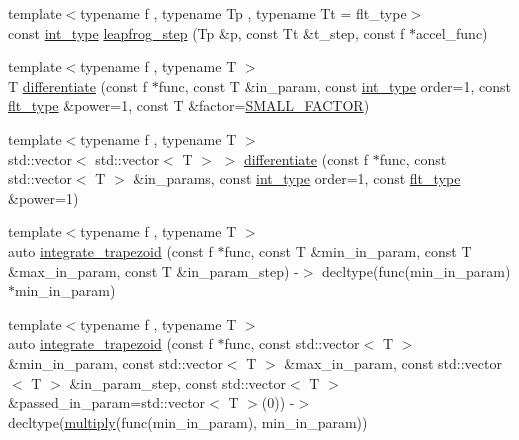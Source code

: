 \begin{DoxyCompactItemize}
\item 
{\footnotesize template$<$typename f , typename Tp , typename Tt  = flt\+\_\+type$>$ }\\const \hyperlink{lib_2IceBRG__main_2common_8h_ac4de9d9335536ac22821171deec8d39e}{int\+\_\+type} \hyperlink{namespaceIceBRG_aa9d2ab9f41c447558b2db6076dfcf3c1}{leapfrog\+\_\+step} (Tp \&p, const Tt \&t\+\_\+step, const f $\ast$accel\+\_\+func)
\item 
{\footnotesize template$<$typename f , typename T $>$ }\\T \hyperlink{namespaceIceBRG_a2e5e6245a68a169006582de78ed4760d}{differentiate} (const f $\ast$func, const T \&in\+\_\+param, const \hyperlink{lib_2IceBRG__main_2common_8h_ac4de9d9335536ac22821171deec8d39e}{int\+\_\+type} order=1, const \hyperlink{lib_2IceBRG__main_2common_8h_ad0f130a56eeb944d9ef2692ee881ecc4}{flt\+\_\+type} \&power=1, const T \&factor=\hyperlink{lib_2IceBRG__main_2common_8h_a730d3bec6e12c0566140efd6b77e3d7d}{S\+M\+A\+L\+L\+\_\+\+F\+A\+C\+T\+O\+R})
\item 
{\footnotesize template$<$typename f , typename T $>$ }\\std\+::vector$<$ std\+::vector$<$ T $>$ $>$ \hyperlink{namespaceIceBRG_a066b3f43de151d16ff1ded1cabd4dae6}{differentiate} (const f $\ast$func, const std\+::vector$<$ T $>$ \&in\+\_\+params, const \hyperlink{lib_2IceBRG__main_2common_8h_ac4de9d9335536ac22821171deec8d39e}{int\+\_\+type} order=1, const \hyperlink{lib_2IceBRG__main_2common_8h_ad0f130a56eeb944d9ef2692ee881ecc4}{flt\+\_\+type} \&power=1)
\item 
{\footnotesize template$<$typename f , typename T $>$ }\\auto \hyperlink{namespaceIceBRG_a4718d7945b3383345eb5cd363438a4ae}{integrate\+\_\+trapezoid} (const f $\ast$func, const T \&min\+\_\+in\+\_\+param, const T \&max\+\_\+in\+\_\+param, const T \&in\+\_\+param\+\_\+step) -\/$>$ decltype(func(min\+\_\+in\+\_\+param)$\ast$min\+\_\+in\+\_\+param)
\item 
{\footnotesize template$<$typename f , typename T $>$ }\\auto \hyperlink{namespaceIceBRG_a8a2af5fc191dca55fe88b73af34be615}{integrate\+\_\+trapezoid} (const f $\ast$func, const std\+::vector$<$ T $>$ \&min\+\_\+in\+\_\+param, const std\+::vector$<$ T $>$ \&max\+\_\+in\+\_\+param, const std\+::vector$<$ T $>$ \&in\+\_\+param\+\_\+step, const std\+::vector$<$ T $>$ \&passed\+\_\+in\+\_\+param=std\+::vector$<$ T $>$(0)) -\/$>$ decltype(\hyperlink{namespaceIceBRG_ab535c998baac3ffc8412fdbae750b7d1}{multiply}(func(min\+\_\+in\+\_\+param), min\+\_\+in\+\_\+param))

\end{DoxyCompactItemize}
